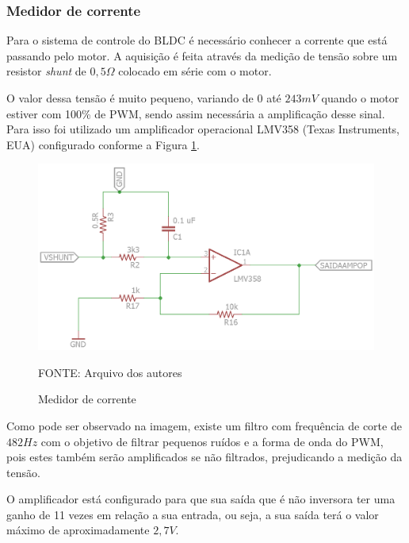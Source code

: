 \documentclass[
	12pt,				%
	openany,			%
	twoside,			%
	a4paper,			%
	english,			%
	french,				%
	spanish,			%
	brazil,				%
	oldfontcommands
	]{abntex2}
\begin{document}
\subsubsection{Medidor de corrente}

Para o sistema de controle do BLDC é necessário conhecer a corrente que está passando pelo motor. A aquisição é feita através da medição de tensão sobre um resistor \textit{shunt} de $0,5\Omega$ colocado  em série com o motor. 

O valor dessa tensão é muito pequeno, variando de $0$ até $243mV$ quando o motor estiver com 100\% de PWM, sendo assim necessária a amplificação desse sinal. Para isso foi utilizado um amplificador operacional LMV358 (Texas Instruments, EUA) configurado conforme a Figura \ref{fig:Medidor_corrente}.

\begin{figure}[th]
	\caption{Medidor de corrente}
	\centering
	\includegraphics[width=1\linewidth]{./figs/Medidor_corrente_motores}
	
	\begin{small}
		FONTE: Arquivo dos autores
	\end{small}
	\label{fig:Medidor_corrente}
\end{figure}


Como pode ser observado na imagem, existe um filtro com frequência de corte de $482Hz$ com o objetivo de filtrar pequenos ruídos e a forma de onda do PWM, pois estes também serão amplificados se não filtrados, prejudicando a medição da tensão.

O amplificador está configurado para que sua saída que é não inversora ter uma ganho de 11 vezes em relação a sua entrada, ou seja, a sua saída terá o valor máximo de aproximadamente $2,7V$.
\end{document}
